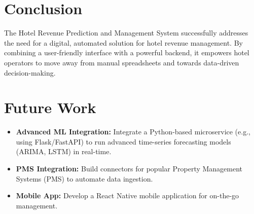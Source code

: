 \documentclass[letterpaper,11pt]{report}
\begin{document}
\section{Conclusion}
The Hotel Revenue Prediction and Management System successfully addresses the need for a digital, automated solution for hotel revenue management. By combining a user-friendly interface with a powerful backend, it empowers hotel operators to move away from manual spreadsheets and towards data-driven decision-making.

\section{Future Work}
\begin{itemize}
    \item \textbf{Advanced ML Integration:} Integrate a Python-based microservice (e.g., using Flask/FastAPI) to run advanced time-series forecasting models (ARIMA, LSTM) in real-time.
    \item \textbf{PMS Integration:} Build connectors for popular Property Management Systems (PMS) to automate data ingestion.
    \item \textbf{Mobile App:} Develop a React Native mobile application for on-the-go management.
\end{itemize}



\end{document}
